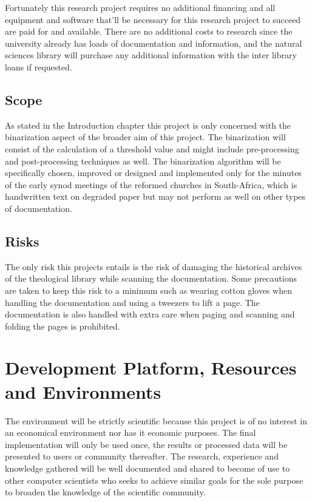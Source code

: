 \documentclass[11pt]{article}
\begin{document}
		Fortunately this research project requires no additional financing and all equipment and software that'll be necessary for this research project to succeed are paid for and available. There are no additional costs to research since the university already has loads of documentation and information, and the natural sciences library will purchase any additional information with the inter library loans if requested.

		\subsection{Scope}
			As stated in the Introduction chapter this project is only concerned with the binarization aspect of the broader aim of this project. The binarization will consist of the calculation of a threshold value and might include pre-processing and post-processing techniques as well. The binarization algorithm will be specifically chosen, improved or designed and implemented only for the minutes of the early synod meetings of the reformed churches in South-Africa, which is handwritten text on degraded paper but may not perform as well on other types of documentation.

		\subsection{Risks}
			The only risk this projects entails is the risk of damaging the historical archives of the theological library while scanning the documentation. Some precautions are taken to keep this risk to a minimum such as wearing cotton gloves when handling the documentation and using a tweezers to lift a page. The documentation is also handled with extra care when paging and scanning and folding the pages is prohibited.

	\section{Development Platform, Resources and Environments}
		The environment will be strictly scientific because this project is of no interest in an economical environment nor has it economic purposes. The final implementation will only be used once, the results or processed data will be presented to users or community thereafter. The research, experience and knowledge gathered will be well documented and shared to become of use to other computer scientists who seeks to achieve similar goals for the sole purpose to broaden the knowledge of the scientific community.\\
\end{document}
